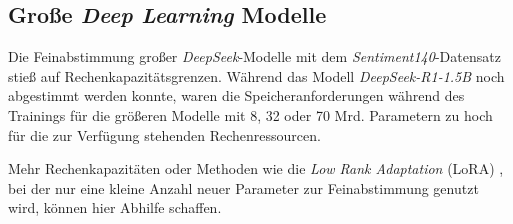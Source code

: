 \subsection{Große \textit{Deep Learning} Modelle}

Die Feinabstimmung großer \textit{DeepSeek}-Modelle mit dem \textit{Sentiment140}-Datensatz stieß auf Rechenkapazitätsgrenzen.
Während das Modell \textit{DeepSeek-R1-1.5B} noch abgestimmt werden konnte, waren die Speicheranforderungen während des Trainings für die größeren Modelle mit 8, 32 oder 70 Mrd. Parametern zu hoch für die zur Verfügung stehenden Rechenressourcen.

Mehr Rechenkapazitäten oder Methoden wie die \textit{Low Rank Adaptation} (LoRA) \cite{lora2021}, bei der nur eine kleine Anzahl neuer Parameter zur Feinabstimmung genutzt wird, können hier Abhilfe schaffen.
